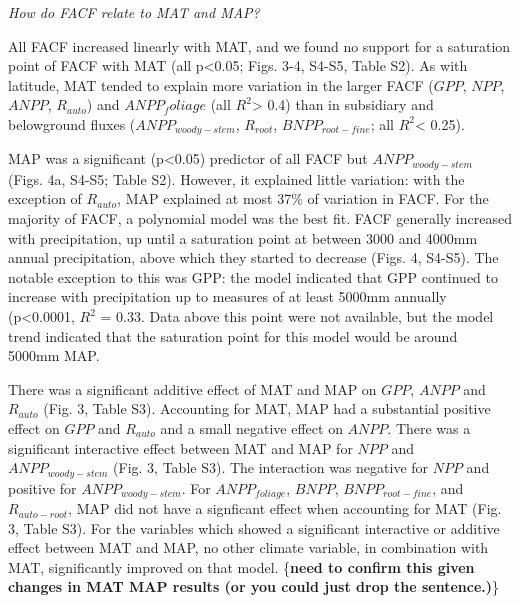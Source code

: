 \documentclass[]{article}
\begin{document}
\emph{How do FACF relate to MAT and MAP?}

All FACF increased linearly with MAT, and we found no support for a
saturation point of FACF with MAT (all p\textless{}0.05; Figs. 3-4,
S4-S5, Table S2). As with latitude, MAT tended to explain more variation
in the larger FACF (\(GPP\), \(NPP\), \(ANPP\), \(R_{auto}\)) and
\(ANPP_foliage\) (all \(R^2\)\textgreater{} 0.4) than in subsidiary and
belowground fluxes (\(ANPP_{woody-stem}\), \(R_{root}\),
\(BNPP_{root-fine}\); all \(R^2\)\textless{} 0.25).

MAP was a significant (p\textless{}0.05) predictor of all FACF but
\(ANPP_{woody-stem}\) (Figs. 4a, S4-S5; Table S2). However, it explained
little variation: with the exception of \(R_{auto}\), MAP explained at
most 37\% of variation in FACF. For the majority of FACF, a polynomial
model was the best fit. FACF generally increased with precipitation, up
until a saturation point at between 3000 and 4000mm annual
precipitation, above which they started to decrease (Figs. 4, S4-S5).
The notable exception to this was GPP: the model indicated that GPP
continued to increase with precipitation up to measures of at least
5000mm annually (p\textless{}0.0001, \(R^2\) = 0.33. Data above this
point were not available, but the model trend indicated that the
saturation point for this model would be around 5000mm MAP.

There was a significant additive effect of MAT and MAP on \(GPP\),
\(ANPP\) and \(R_{auto}\) (Fig. 3, Table S3). Accounting for MAT, MAP
had a substantial positive effect on \(GPP\) and \(R_{auto}\) and a
small negative effect on \(ANPP\). There was a significant interactive
effect between MAT and MAP for \(NPP\) and \(ANPP_{woody-stem}\) (Fig.
3, Table S3). The interaction was negative for \(NPP\) and positive for
\(ANPP_{woody-stem}\). For \(ANPP_{foliage}\), \(BNPP\),
\(BNPP_{root-fine}\), and \(R_{auto-root}\), MAP did not have a
signficant effect when accounting for MAT (Fig. 3, Table S3). For the
variables which showed a significant interactive or additive effect
between MAT and MAP, no other climate variable, in combination with MAT,
significantly improved on that model. \{\textbf{need to confirm this
given changes in MAT MAP results (or you could just drop the
sentence.)}\}
\end{document}

